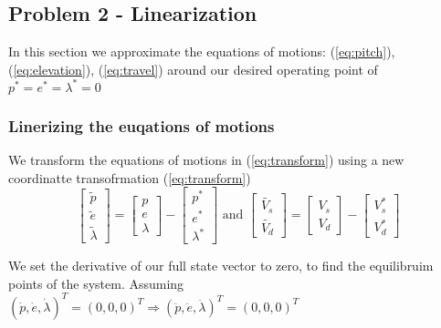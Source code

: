 
\subsection{Problem 2 - Linearization}
In this section we approximate the equations of motions: (\ref{eq:pitch}), (\ref{eq:elevation}), (\ref{eq:travel}) around our desired operating point of ${p^*}={e^*}={\lambda^*}=0$


 \subsubsection{Linerizing the euqations of motions}
 
 
 
We transform the equations of motions in (\ref{eq:transform}) using a new coordinatte transofrmation (\ref{eq:transform}) 
\begin{equation} \label{eq:transform}
\begin{bmatrix}
    \tilde{p}\\
    \tilde{e}\\
    \tilde{\lambda}
    \end{bmatrix}
    =
    \begin{bmatrix}
        p\\
        e\\
        \lambda
    \end{bmatrix}
    -
    \begin{bmatrix}
        p^*\\
        e^*\\
        \lambda^*
    \end{bmatrix}
   \text{   and   }
    \begin{bmatrix}
         \tilde{V_s}\\
    \tilde{V_d}
    \end{bmatrix}
    =
    \begin{bmatrix}
        V_s\\
        V_d
    \end{bmatrix}
    -
    \begin{bmatrix}
     V_s^*\\
     V_d^*
    \end{bmatrix}
\end{equation} %

We set the derivative of our full state vector to zero, to find the equilibruim points of the system. Assuming $(\dot{p}, \dot{e},\dot{\lambda})^T=(0,0,0)^T \Rightarrow 
(\ddot{p}, \ddot{e},\ddot{\lambda})^T=(0,0,0)^T$

